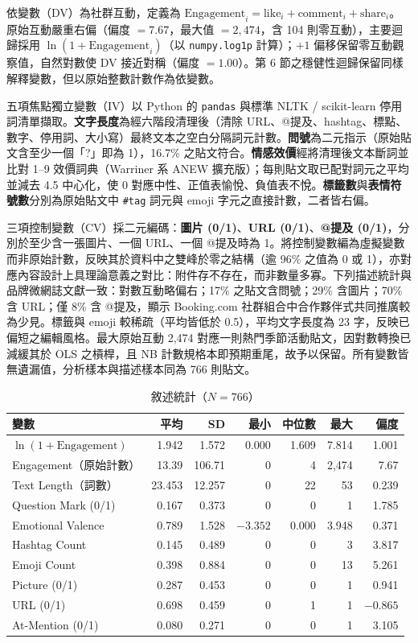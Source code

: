 \documentclass[12pt,a4paper]{ctexart}
\begin{document}
依變數（DV）為社群互動，定義為 $\text{Engagement}_i = \text{like}_i + \text{comment}_i + \text{share}_i$。原始互動嚴重右偏（偏度 $=7.67$，最大值 $=2{,}474$，含 104 則零互動），主要迴歸採用 $\ln(1+\text{Engagement}_i)$（以 \texttt{numpy.log1p} 計算）；$+1$ 偏移保留零互動觀察值，自然對數使 DV 接近對稱（偏度 $=1.00$）。第 6 節之穩健性迴歸保留同樣解釋變數，但以原始整數計數作為依變數。

五項焦點獨立變數（IV）以 Python 的 \texttt{pandas} 與標準 NLTK / scikit-learn 停用詞清單擷取。\textbf{文字長度}為經六階段清理後（清除 URL、@提及、hashtag、標點、數字、停用詞、大小寫）最終文本之空白分隔詞元計數。\textbf{問號}為二元指示（原始貼文含至少一個「?」即為 1），16.7\% 之貼文符合。\textbf{情感效價}經將清理後文本斷詞並比對 1--9 效價詞典（Warriner 系 ANEW 擴充版）；每則貼文取已配對詞元之平均並減去 4.5 中心化，使 0 對應中性、正值表愉悅、負值表不悅。\textbf{標籤數}與\textbf{表情符號數}分別為原始貼文中 \texttt{\#tag} 詞元與 emoji 字元之直接計數，二者皆右偏。

三項控制變數（CV）採二元編碼：\textbf{圖片 (0/1)}、\textbf{URL (0/1)}、\textbf{@提及 (0/1)}，分別於至少含一張圖片、一個 URL、一個 @提及時為 1。將控制變數編為虛擬變數而非原始計數，反映其於資料中之雙峰於零之結構（逾 96\% 之值為 0 或 1），亦對應內容設計上具理論意義之對比：附件存不存在，而非數量多寡。下列描述統計與品牌微網誌文獻一致：對數互動略偏右；17\% 之貼文含問號；29\% 含圖片；70\% 含 URL；僅 8\% 含 @提及，顯示 Booking.com 社群組合中合作夥伴式共同推廣較為少見。標籤與 emoji 較稀疏（平均皆低於 0.5），平均文字長度為 23 字，反映已偏短之編輯風格。最大原始互動 2{,}474 對應一則熱門季節活動貼文，因對數轉換已減緩其於 OLS 之槓桿，且 NB 計數規格本即預期重尾，故予以保留。所有變數皆無遺漏值，分析樣本與描述樣本同為 766 則貼文。

\begin{table}[H]
\centering\small
\caption{敘述統計（$N=766$）}
\begin{tabular}{lrrrrrr}
\toprule
變數 & 平均 & SD & 最小 & 中位數 & 最大 & 偏度 \\
\midrule
$\ln(1+\text{Engagement})$ & 1.942 & 1.572 & 0.000 & 1.609 & 7.814 & 1.001 \\
Engagement（原始計數） & 13.39 & 106.71 & 0 & 4 & 2{,}474 & 7.67 \\
Text Length（詞數） & 23.453 & 12.257 & 0 & 22 & 53 & 0.239 \\
Question Mark (0/1) & 0.167 & 0.373 & 0 & 0 & 1 & 1.785 \\
Emotional Valence & 0.789 & 1.528 & $-3.352$ & 0.000 & 3.948 & 0.371 \\
Hashtag Count & 0.145 & 0.489 & 0 & 0 & 3 & 3.817 \\
Emoji Count & 0.398 & 0.884 & 0 & 0 & 13 & 5.261 \\
Picture (0/1) & 0.287 & 0.453 & 0 & 0 & 1 & 0.941 \\
URL (0/1) & 0.698 & 0.459 & 0 & 1 & 1 & $-0.865$ \\
At-Mention (0/1) & 0.080 & 0.271 & 0 & 0 & 1 & 3.105 \\
\bottomrule
\end{tabular}
\end{table}
\end{document}
